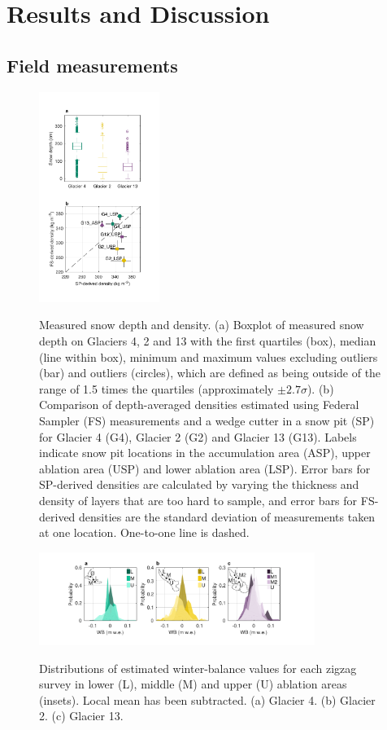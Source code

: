 \documentclass[review,oneside, letterpaper]{igs} %
\begin{document}
\section{Results and Discussion}

\subsection{Field measurements}

\begin{figure}
	\centering
	\includegraphics[width =0.35\textwidth]{DepthBoxplot_SPvsFS.pdf}\\
	\caption{Measured snow depth and density. (a) Boxplot of measured snow depth on Glaciers 4, 2 and 13 with the first quartiles (box), median (line within box), minimum and maximum values excluding outliers (bar) and outliers (circles), which are defined as being outside of the range of 1.5 times the quartiles (approximately $\pm2.7\sigma$). (b) Comparison of depth-averaged densities estimated using Federal Sampler (FS) measurements and  a wedge cutter in a snow pit (SP)  for Glacier 4 (G4), Glacier 2 (G2) and Glacier 13 (G13). Labels indicate snow pit locations in the accumulation area (ASP), upper ablation area (USP) and lower ablation area (LSP). Error bars for SP-derived densities are calculated by varying the thickness and density of layers that are too hard to sample, and error bars for FS-derived densities are the standard deviation of measurements taken at one location. One-to-one line is dashed.}
	\label{fig:DepthBoxplot_SPvsFS}
\end{figure}

\begin{figure}
	\centering
	\includegraphics[width =0.8\textwidth]{ZigzagHistogram.pdf}\\
	\caption{Distributions of estimated winter-balance values for each zigzag survey in lower (L), middle (M) and upper (U) ablation areas (insets). Local mean has been subtracted. (a) Glacier 4. (b) Glacier 2. (c) Glacier 13.}
	\label{fig:ZigzagHistogram}
\end{figure}
\end{document}
